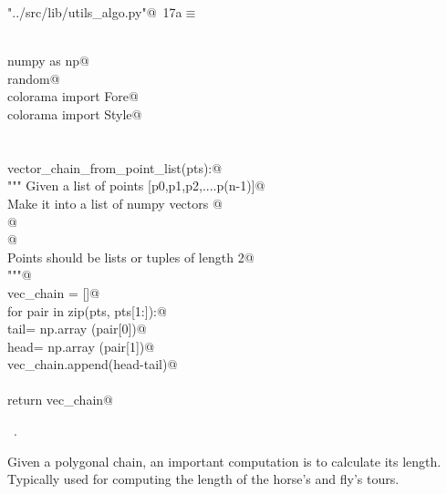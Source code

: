 \documentclass[11.5pt]{report}
\begin{document}
\begin{flushleft} \small\label{scrap8}\raggedright\small
{} \verb@"../src/lib/utils_algo.py"@\nobreak\ {\footnotesize {17a}}$\equiv$
\vspace{-1ex}
\begin{list}{}{} \item
\mbox{}\verb@@\\
\mbox{}\verb@import numpy as np@\\
\mbox{}\verb@import random@\\
\mbox{}\verb@from colorama import Fore@\\
\mbox{}\verb@from colorama import Style@\\
\mbox{}\verb@@\\
\mbox{}\verb@@\\
\mbox{}\verb@def vector_chain_from_point_list(pts):@\\
\mbox{}\verb@    """ Given a list of points [p0,p1,p2,....p(n-1)]@\\
\mbox{}\verb@    Make it into a list of numpy vectors @\\
\mbox{}\verb@    [p1-p0, p2-p1,...,p(n-1)-p(n-2)]@\\
\mbox{}\verb@    @\\
\mbox{}\verb@    Points should be lists or tuples of length 2@\\
\mbox{}\verb@    """@\\
\mbox{}\verb@    vec_chain = []@\\
\mbox{}\verb@    for pair in zip(pts, pts[1:]):@\\
\mbox{}\verb@        tail= np.array (pair[0])@\\
\mbox{}\verb@        head= np.array (pair[1])@\\
\mbox{}\verb@        vec_chain.append(head-tail)@\\
\mbox{}\verb@@\\
\mbox{}\verb@    return vec_chain@\\
\mbox{}\verb@@{\NWsep}
\end{list}
\vspace{-1.5ex}
\footnotesize
\begin{list}{}{\setlength{\itemsep}{-\parsep}\setlength{\itemindent}{-\leftmargin}}
\item \NWtxtFileDefBy\ .

\item{}
\end{list}
\vspace{4ex}
\end{flushleft}
\newchunk Given a polygonal chain, an important computation is to calculate 
its length. Typically used for computing the length of the horse's and fly's tours. 
\end{document}
